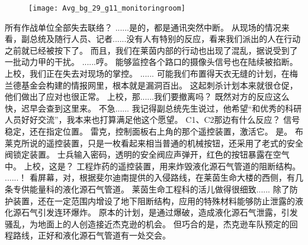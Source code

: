 \documentclass[openany]{book}
\begin{document}
\begin{figure}[h]
    \centering
    \texttt{[image: Avg\_bg\_29\_g11\_monitoringroom]}
\end{figure}
\begin{dialogue}
     所有作战单位全部失去联络？
     ......是的，都是通讯突然中断。
     从现场的情况来看，副总统及随行人员、记者......没有人有特别的反应，看来我们派出的人在行动之前就已经被按下了。
     而且，我们在莱茵内部的行动也出现了混乱，据说受到了一批动力甲的干扰。
     ......哼。
     能够监控各个路口的摄像头信号也在陆续被掐断。
     上校，我们正在失去对现场的掌控。
     ......
     可能我们布置得天衣无缝的计划，在梅兰德基金会构建的情报网里，根本就是漏洞百出。
     这起刺杀计划本来就很仓促，他们做出了应对也很正常。
     上校，那......我们要撤离吗？
     既然对方的反应这么快，迟早会查到这里来。
     不急......
     我记得副总统先生说过，他希望“和优秀的科研人员好好交流”，我本来也打算满足他这个愿望。
     C1、C2那边有什么反应？
     信号稳定，还在指定位置。
     雷克，控制面板右上角的那个遥控装置，激活它。
     是。
    布莱克所说的遥控装置，只是一枚看起来相当普通的机械按钮，还采用了老式的安全阀锁定装置。
    士兵输入密码，透明的安全阀应声弹开，红色的按钮暴露在空气中。
     上校，这是？
     工程炸药的遥控装置，用来炸毁液化源石气管道的阻断结构。
     ......！
     看屏幕，对，根据斐尔迪南提供的入侵路线，在莱茵生命大楼的西侧，有几条专供能量科的液化源石气管道。
     莱茵生命工程科的活儿做得很细致......
     除了防护装置，还在一定范围内增设了地下阻断结构，应用的特殊材料能够防止泄露的液化源石气引发连环爆炸。
     原本的计划，是通过爆破，造成液化源石气泄露，引发骚乱，为地面上的人创造接近杰克逊的机会。
     但巧合的是，杰克逊车队预定的回程路线，正好和液化源石气管道有一处交会。
\end{dialogue}
\end{document}
